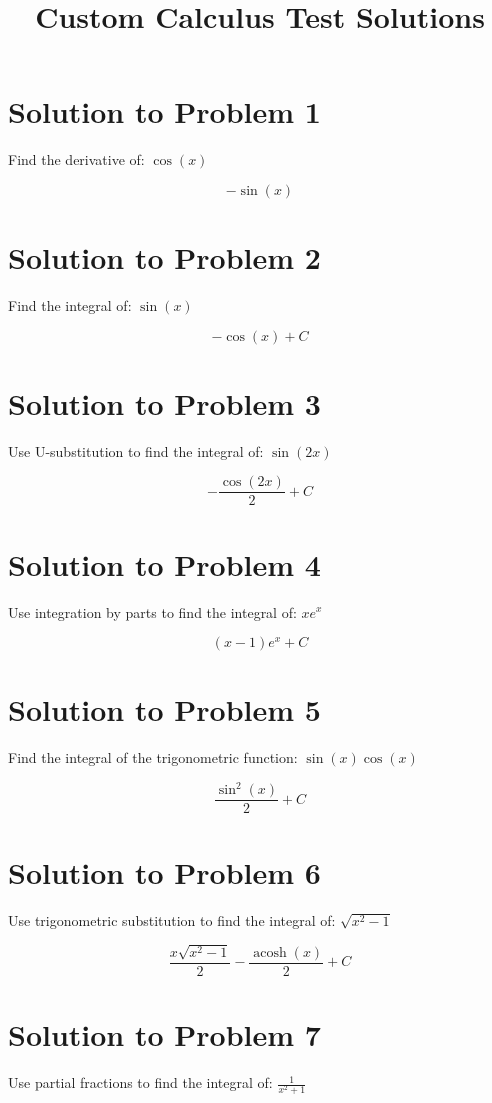 \documentclass{article}
\begin{document}
\title{Custom Calculus Test Solutions}
\author{}
\date{}
\maketitle
\section*{Solution to Problem 1}
Find the derivative of: $\cos{\left(x \right)}$

\[ - \sin{\left(x \right)} \]

\section*{Solution to Problem 2}
Find the integral of: $\sin{\left(x \right)}$

\[ - \cos{\left(x \right)} + C \]

\section*{Solution to Problem 3}
Use U-substitution to find the integral of: $\sin{\left(2 x \right)}$

\[ - \frac{\cos{\left(2 x \right)}}{2} + C \]

\section*{Solution to Problem 4}
Use integration by parts to find the integral of: $x e^{x}$

\[ \left(x - 1\right) e^{x} + C \]

\section*{Solution to Problem 5}
Find the integral of the trigonometric function: $\sin{\left(x \right)} \cos{\left(x \right)}$

\[ \frac{\sin^{2}{\left(x \right)}}{2} + C \]

\section*{Solution to Problem 6}
Use trigonometric substitution to find the integral of: $\sqrt{x^{2} - 1}$

\[ \frac{x \sqrt{x^{2} - 1}}{2} - \frac{\operatorname{acosh}{\left(x \right)}}{2} + C \]

\section*{Solution to Problem 7}
Use partial fractions to find the integral of: $\frac{1}{x^{2} + 1}$
\end{document}
